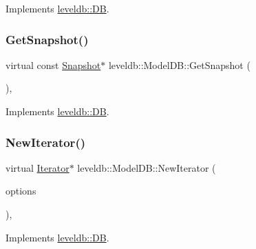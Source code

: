 Implements \mbox{\hyperlink{classleveldb_1_1_d_b_afcd557d80bac6668f20372c9e737d807}{leveldb\+::\+DB}}.

\mbox{\label{classleveldb_1_1_model_d_b_aa82849af6a149d122e65a4aac412903f}} 
\subsubsection{\texorpdfstring{GetSnapshot()}{GetSnapshot()}}
{\footnotesize\ttfamily virtual const \mbox{\hyperlink{classleveldb_1_1_snapshot}{Snapshot}}$\ast$ leveldb\+::\+Model\+D\+B\+::\+Get\+Snapshot (\begin{DoxyParamCaption}{ }\end{DoxyParamCaption})\hspace{0.3cm}{\ttfamily [inline]}, {\ttfamily [virtual]}}



Implements \mbox{\hyperlink{classleveldb_1_1_d_b_a7d13f6336c7c5f0bf79578d57c45568c}{leveldb\+::\+DB}}.

\mbox{\label{classleveldb_1_1_model_d_b_a5acf23bae313f2e2f3ea9f0ab95450cf}} 
\subsubsection{\texorpdfstring{NewIterator()}{NewIterator()}}
{\footnotesize\ttfamily virtual \mbox{\hyperlink{classleveldb_1_1_iterator}{Iterator}}$\ast$ leveldb\+::\+Model\+D\+B\+::\+New\+Iterator (\begin{DoxyParamCaption}\item[{const \mbox{\hyperlink{structleveldb_1_1_read_options}{Read\+Options}} \&}]{options }\end{DoxyParamCaption})\hspace{0.3cm}{\ttfamily [inline]}, {\ttfamily [virtual]}}



Implements \mbox{\hyperlink{classleveldb_1_1_d_b_a5629308235de24c05c286c353d4e7d32}{leveldb\+::\+DB}}.

\mbox{\label{classleveldb_1_1_model_d_b_a83d0ace11c8ff079f4e6eaa905744253}} 
